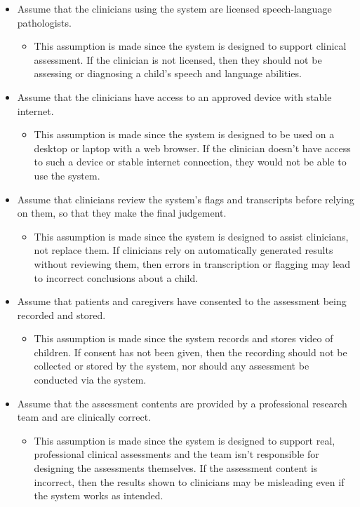 \documentclass{article}
\begin{document}
\begin{itemize}
    \item Assume that the clinicians using the system are licensed speech-language pathologists.
    \begin{itemize}
        \item This assumption is made since the system is designed to support clinical assessment. If the clinician is not licensed, then they should not be assessing or diagnosing a child's speech and language abilities.
    \end{itemize}
    \item Assume that the clinicians have access to an approved device with stable internet.
    \begin{itemize}
        \item This assumption is made since the system is designed to be used on a desktop or laptop with a web browser. If the clinician doesn't have access to such a device or stable internet connection, they would not be able to use the system.
    \end{itemize}
    \item Assume that clinicians review the system's flags and transcripts before relying on them, so that they make the final judgement.
    \begin{itemize}
        \item This assumption is made since the system is designed to assist clinicians, not replace them. If clinicians rely on automatically generated results without reviewing them, then errors in transcription or flagging may lead to incorrect conclusions about a child.
    \end{itemize}
    \item Assume that patients and caregivers have consented to the assessment being recorded and stored.
    \begin{itemize}
        \item This assumption is made since the system records and stores video of children. If consent has not been given, then the recording should not be collected or stored by the system, nor should any assessment be conducted via the system.
    \end{itemize}
    \item Assume that the assessment contents are provided by a professional research team and are clinically correct.
    \begin{itemize}
        \item This assumption is made since the system is designed to support real, professional clinical assessments and the team isn't responsible for designing the assessments themselves. If the assessment content is incorrect, then the results shown to clinicians may be misleading even if the system works as intended.

\end{itemize}
\end{itemize}
\end{document}
